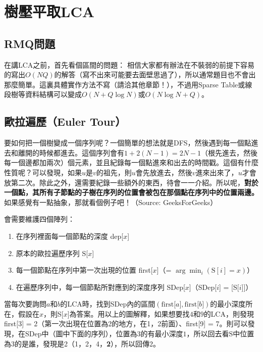 	\section{樹壓平取LCA}
		\subsection{RMQ問題}
			在講LCA之前，首先看個區間的問題：
			相信大家都有辦法在不裝弱的前提下容易的寫出$O(NQ)$的解答（寫不出來可能要去面壁思過了），所以通常題目也不會出那麼簡單。這裏具體實作方法不寫（請洽其他章節！），不過用Sparse Table或線段樹等資料結構可以變成$O(N + Q \log N)$或$O(N \log N + Q)$。
		\subsection{歐拉遍歷（Euler Tour）}
			要如何把一個樹變成一個序列呢？一個簡單的想法就是DFS，然後遇到每一個點進去和離開的時候都進去。這個序列會有$1 + 2(N - 1) = 2N - 1$（根先進去，然後每一個邊都加兩次）個元素，並且紀錄每一個點進來和出去的時間戳。這個有什麼性質呢？可以發現，如果$u$是$v$的祖先，則$u$會先放進去，然後$v$進來出來了，$u$才會放第二次。除此之外，還需要紀錄一些額外的東西，待會一一介紹。所以呢，\textbf{對於一個點，其所有子節點的子樹在序列的位置會被包在那個點在序列中的位置兩邊。}如果感覺有一點抽象，那就看個例子吧！（Source: GeeksForGeeks）
			\begin{center}
			\end{center}
			會需要維護四個陣列：
			\begin{enumerate}
				\item 在序列裡面每一個節點的深度 dep[$x$]
				\item 原本的歐拉遍歷序列 S[$x$]
				\item 每一個節點在序列中第一次出現的位置 first[$x$]（= $\arg \min_{i} (\text{S}[i] = x)$）
				\item 在遍歷序列中，每一個節點所對應到的深度序列 SDep[$x$]（SDep[$i$] = [S[$i$]]）
			\end{enumerate}
			當每次要詢問$a$和$b$的LCA時，找到SDep內的區間$(\text{first[}a\text{]}, \text{first[}b\text{]})$的最小深度所在，假設在$x$，則S[$x$]為答案。用以上的圖解釋，如果想要找$4$和$9$的LCA，則發現first[$3$] = 2（第一次出現在位置為2的地方，在1，2前面）、first[9] = 7。則可以發現，在SDep中（圖中下面的序列），位置為$3$的有最小深度$1$，所以回去看S中位置為3的是誰，發現是2（1，2，4，\textbf{2}），所以回傳2。
